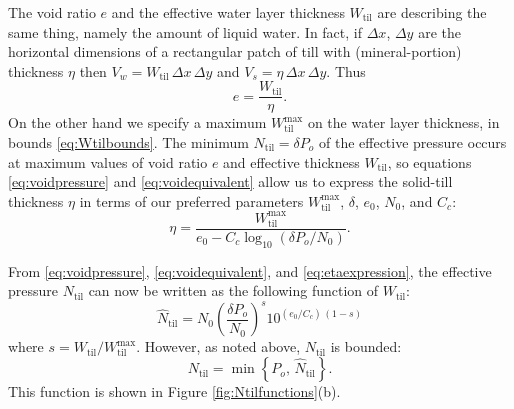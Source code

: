 \documentclass[gmd]{copernicus}   %
\begin{document}
The void ratio $e$ and the effective water layer thickness $W_{\text{til}}$ are describing the same thing, namely the amount of liquid water.  In fact, if $\Delta x$, $\Delta y$ are the horizontal dimensions of a rectangular patch of till with (mineral-portion) thickness $\eta$ then $V_w = W_{\text{til}} \,\Delta x \,\Delta y$ and $V_s = \eta \,\Delta x \,\Delta y$.  Thus
\begin{equation}
e = \frac{W_{\text{til}}}{\eta}.  \label{eq:voidequivalent}
\end{equation}
On the other hand we specify a maximum $W_{\text{til}}^{\text{max}}$ on the water layer thickness, in bounds \eqref{eq:Wtilbounds}.  The minimum $N_{\text{til}}=\delta P_o$ of the effective pressure occurs at maximum values of void ratio $e$ and effective thickness $W_{\text{til}}$, so equations \eqref{eq:voidpressure} and \eqref{eq:voidequivalent} allow us to express the solid-till thickness $\eta$ in terms of our preferred parameters $W_{\text{til}}^{\text{max}}$, $\delta$, $e_0$, $N_0$, and $C_c$:
\begin{equation}
\eta = \frac{W_{\text{til}}^{\text{max}}}{e_0 - C_c \log_{10}\left(\delta P_o / N_0\right)}.  \label{eq:etaexpression}
\end{equation}

From \eqref{eq:voidpressure}, \eqref{eq:voidequivalent}, and \eqref{eq:etaexpression}, the effective pressure $N_{\text{til}}$ can now be written as the following function of $W_{\text{til}}$:
\begin{equation}
\hat N_{\text{til}} = N_0 \left(\frac{\delta P_o}{N_0}\right)^s 10^{(e_0/C_c)\,(1-s)}
\label{eq:NtilofWtil}
\end{equation}
where $s = W_{\text{til}}/W_{\text{til}}^{\text{max}}$.  However, as noted above, $N_{\text{til}}$ is bounded:
\begin{equation}
N_{\text{til}} = \min\left\{P_o,\, \hat N_{\text{til}}\right\}.
\label{eq:Wtilpressure}
\end{equation}
This function is shown in Figure \ref{fig:Ntilfunctions}(b).
\end{document}
